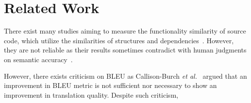 \section{Related Work}

There exist
many studies aiming to measure the functionality similarity of source
code, which utilize the similarities of structures and
dependencies~\cite{clone-tse07,roy09,baker97,ccfinder,cpminer,deckard,deckard2,horwitz01}.
However, they are not reliable as their results sometimes contradict
with human judgments on semantic accuracy~\cite{deckard2}.

However, there exists criticism on BLEU
as Callison-Burch {\em et al.}~\cite{Callison} argued that an
improvement in BLEU metric is not sufficient nor necessary to show an
improvement in translation quality. Despite such criticism,
